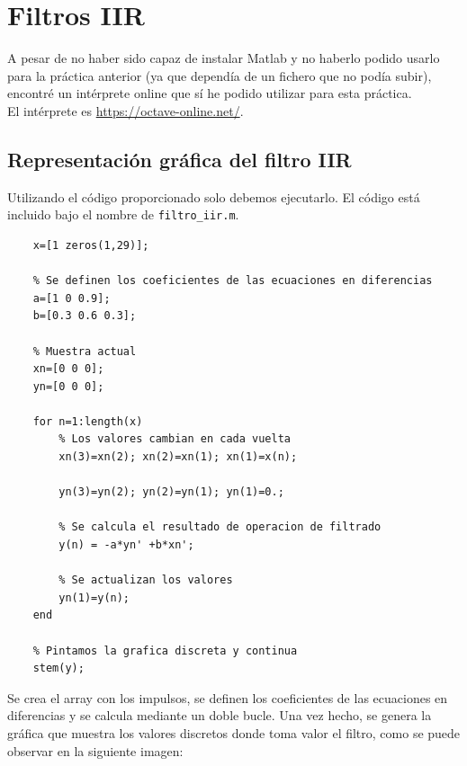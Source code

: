 \documentclass[11pt,a4paper]{article}
\begin{document}
\tableofcontents
\thispagestyle{empty}

\newpage

\section{Filtros IIR}

A pesar de no haber sido capaz de instalar Matlab y no haberlo podido usarlo para la práctica anterior (ya que dependía de un fichero que no podía subir), encontré un intérprete online que sí he podido utilizar para esta práctica.\\

El intérprete es \color{blue} \url{https://octave-online.net/}\color{black}.

\subsection{Representación gráfica del filtro IIR}

Utilizando el código proporcionado solo debemos ejecutarlo. El código está incluido bajo el nombre de \texttt{filtro\_iir.m}.

\begin{lstlisting}[frame=single]
	% Se define el array con los pulsos
   	x=[1 zeros(1,29)];
   	
   	% Se definen los coeficientes de las ecuaciones en diferencias
	a=[1 0 0.9];
	b=[0.3 0.6 0.3];
	
	% Muestra actual
	xn=[0 0 0];
	yn=[0 0 0];
	
	for n=1:length(x)
		% Los valores cambian en cada vuelta
		xn(3)=xn(2); xn(2)=xn(1); xn(1)=x(n);
		
		yn(3)=yn(2); yn(2)=yn(1); yn(1)=0.;
		
		% Se calcula el resultado de operacion de filtrado
		y(n) = -a*yn' +b*xn';
		
		% Se actualizan los valores
		yn(1)=y(n);
	end
	
	% Pintamos la grafica discreta y continua
	stem(y);
\end{lstlisting}

Se crea el array con los impulsos, se definen los coeficientes de las ecuaciones en diferencias y se calcula mediante un doble bucle. Una vez hecho, se genera la gráfica que muestra los valores discretos donde toma valor el filtro, como se puede observar en la siguiente imagen:
\end{document}
